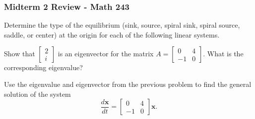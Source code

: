 \documentclass[11pt]{exam}
\newcommand{\ds}{\displaystyle}
\begin{document}
\graphicspath{{/home/brian/Dropbox/HSC/Spring16/Math111/}}

\subsubsection*{Midterm 2 Review - Math 243}

\begin{questions}
\question Determine the type of the equilibrium (sink, source, spiral sink, spiral source, saddle, or center) at the origin for each of the following linear systems. 

\question Show that $\begin{bmatrix} 2 \\ i \end{bmatrix}$  is an eigenvector for the matrix $A = \begin{bmatrix} 0 & 4 \\ -1 & 0 \end{bmatrix}$. What is the corresponding eigenvalue? 

\question Use the eigenvalue and eigenvector from the previous problem to find the general solution of the system
$$\dfrac{d\mathbf{x}}{dt} = \begin{bmatrix} 0 & 4 \\ -1 & 0 \end{bmatrix} \mathbf{x}.$$



\end{questions}
\end{document}
